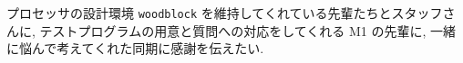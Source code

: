 \documentclass[../main.tex]{subfiles}
\begin{document}
  プロセッサの設計環境 \verb|woodblock| を維持してくれている先輩たちとスタッフさんに, 
  テストプログラムの用意と質問への対応をしてくれる M1 の先輩に, 
  一緒に悩んで考えてくれた同期に感謝を伝えたい.
\end{document}
